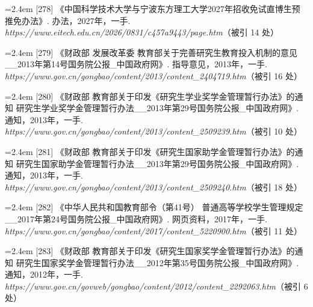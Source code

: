 {\vspace{0.6pt}
\vspace{3.5pt}\par
\nopagebreak\vspace{1pt}
\noindent\hangindent=2.4em \label{src:S0362}{\color{cAccent}[278]} 《中国科学技术大学与宁波东方理工大学2027年招收免试直博生预推免办法》. 办法，2027年，一手. \textit{https://www.eitech.edu.cn/2026/0831/c457a9443/page.htm}（被引 14 处）\par
\vspace{0.6pt}
\vspace{3.5pt}\par
\nopagebreak\vspace{1pt}
\noindent\hangindent=2.4em \label{src:S0363}{\color{cAccent}[279]} 《财政部 发展改革委 教育部关于完善研究生教育投入机制的意见\_\_2013年第14号国务院公报\_中国政府网》. 指导意见，2013年，一手. \textit{https://www.gov.cn/gongbao/content/2013/content\_2404719.htm}（被引 16 处）\par
\vspace{0.6pt}
\noindent\hangindent=2.4em \label{src:S0364}{\color{cAccent}[280]} 《财政部 教育部关于印发《研究生学业奖学金管理暂行办法》的通知 研究生学业奖学金管理暂行办法\_\_2013年第29号国务院公报\_中国政府网》. 通知，2013年，一手. \textit{https://www.gov.cn/gongbao/content/2013/content\_2509239.htm}（被引 10 处）\par
\vspace{0.6pt}
\noindent\hangindent=2.4em \label{src:S0365}{\color{cAccent}[281]} 《财政部 教育部关于印发《研究生国家助学金管理暂行办法》的通知 研究生国家助学金管理暂行办法\_\_2013年第29号国务院公报\_中国政府网》. 通知，2013年，一手. \textit{https://www.gov.cn/gongbao/content/2013/content\_2509240.htm}（被引 18 处）\par
\vspace{0.6pt}
\noindent\hangindent=2.4em \label{src:S0366}{\color{cAccent}[282]} 《中华人民共和国教育部令（第41号） 普通高等学校学生管理规定\_\_2017年第24号国务院公报\_中国政府网》. 网页资料，2017年，一手. \textit{https://www.gov.cn/gongbao/content/2017/content\_5220900.htm}（被引 11 处）\par
\vspace{0.6pt}
\noindent\hangindent=2.4em \label{src:S0367}{\color{cAccent}[283]} 《财政部 教育部关于印发《研究生国家奖学金管理暂行办法》的通知 研究生国家奖学金管理暂行办法\_\_2012年第35号国务院公报\_中国政府网》. 通知，2012年，一手. \textit{https://www.gov.cn/govweb/gongbao/content/2012/content\_2292063.htm}（被引 6 处）\par
}
